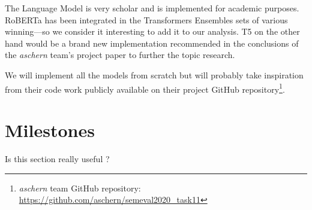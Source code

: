 \documentclass[11pt]{article}
\begin{document}
The Language Model is very scholar and is implemented for academic purposes. RoBERTa has been integrated in the Transformers Ensembles sets of various winning—so we consider it interesting to add it to our analysis. T5 on the other hand would be a brand new implementation recommended in the conclusions of the \textit{aschern} \citet{aschern} team's project paper to further the topic research.

We will implement all the models from scratch but will probably take inspiration from their code work publicly available on their project GitHub repository\footnote{\textit{aschern} team GitHub repository: \url{https://github.com/aschern/semeval2020_task11}}.

\section{Milestones}
Is this section really useful ?

\nocite{}




\end{document}
